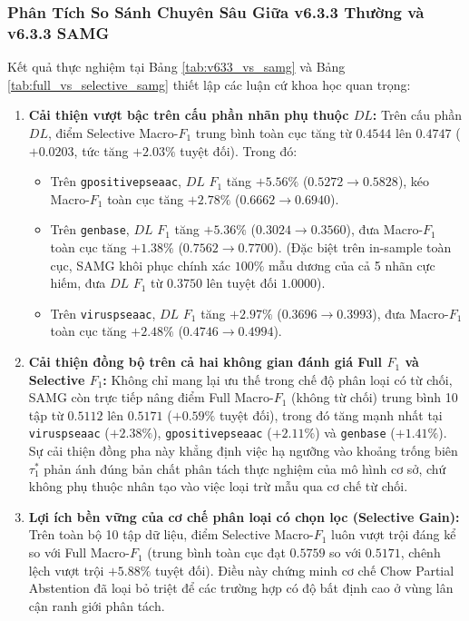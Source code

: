 \documentclass[10pt,a4paper,twoside]{article}
\begin{document}
\subsubsection{Phân Tích So Sánh Chuyên Sâu Giữa v6.3.3 Thường và v6.3.3 SAMG}
Kết quả thực nghiệm tại Bảng \ref{tab:v633_vs_samg} và Bảng \ref{tab:full_vs_selective_samg} thiết lập các luận cứ khoa học quan trọng:
\begin{enumerate}[leftmargin=*]
    \item \textbf{Cải thiện vượt bậc trên cấu phần nhãn phụ thuộc $DL$:} Trên cấu phần $DL$, điểm Selective Macro-$F_1$ trung bình toàn cục tăng từ $0.4544$ lên $0.4747$ ($+0.0203$, tức tăng $+2.03\%$ tuyệt đối). Trong đó:
    \begin{itemize}
        \item Trên \texttt{gpositivepseaac}, $DL$ $F_1$ tăng $+5.56\%$ ($0.5272 \to 0.5828$), kéo Macro-$F_1$ toàn cục tăng $+2.78\%$ ($0.6662 \to 0.6940$).
        \item Trên \texttt{genbase}, $DL$ $F_1$ tăng $+5.36\%$ ($0.3024 \to 0.3560$), đưa Macro-$F_1$ toàn cục tăng $+1.38\%$ ($0.7562 \to 0.7700$). (Đặc biệt trên in-sample toàn cục, SAMG khôi phục chính xác $100\%$ mẫu dương của cả 5 nhãn cực hiếm, đưa $DL$ $F_1$ từ $0.3750$ lên tuyệt đối $1.0000$).
        \item Trên \texttt{viruspseaac}, $DL$ $F_1$ tăng $+2.97\%$ ($0.3696 \to 0.3993$), đưa Macro-$F_1$ toàn cục tăng $+2.48\%$ ($0.4746 \to 0.4994$).
    \end{itemize}
    \item \textbf{Cải thiện đồng bộ trên cả hai không gian đánh giá Full $F_1$ và Selective $F_1$:}
    Không chỉ mang lại ưu thế trong chế độ phân loại có từ chối, SAMG còn trực tiếp nâng điểm Full Macro-$F_1$ (không từ chối) trung bình 10 tập từ $0.5112$ lên $\mathbf{0.5171}$ ($+0.59\%$ tuyệt đối), trong đó tăng mạnh nhất tại \texttt{viruspseaac} ($+2.38\%$), \texttt{gpositivepseaac} ($+2.11\%$) và \texttt{genbase} ($+1.41\%$). Sự cải thiện đồng pha này khẳng định việc hạ ngưỡng vào khoảng trống biên $\tau_1^*$ phản ánh đúng bản chất phân tách thực nghiệm của mô hình cơ sở, chứ không phụ thuộc nhân tạo vào việc loại trừ mẫu qua cơ chế từ chối.
    \item \textbf{Lợi ích bền vững của cơ chế phân loại có chọn lọc (Selective Gain):}
    Trên toàn bộ 10 tập dữ liệu, điểm Selective Macro-$F_1$ luôn vượt trội đáng kể so với Full Macro-$F_1$ (trung bình toàn cục đạt $0.5759$ so với $0.5171$, chênh lệch vượt trội $+5.88\%$ tuyệt đối). Điều này chứng minh cơ chế Chow Partial Abstention đã loại bỏ triệt để các trường hợp có độ bất định cao ở vùng lân cận ranh giới phân tách.

\end{enumerate}
\end{document}
